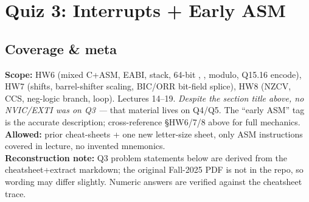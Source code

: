 \section{Quiz 3: Interrupts + Early ASM}

\subsection{Coverage \& meta}
\textbf{Scope:} HW6 (mixed C+ASM, EABI, stack, 64-bit , ,  modulo, Q15.16 encode), HW7 (shifts, barrel-shifter scaling, BIC/ORR bit-field splice), HW8 (NZCV, CCS, neg-logic branch,  loop). Lectures 14--19. \emph{Despite the section title above, no NVIC/EXTI was on Q3 ---} that material lives on Q4/Q5. The ``early ASM'' tag is the accurate description; cross-reference \S HW6/7/8 above for full mechanics.\\
\textbf{Allowed:} prior cheat-sheets + one new letter-size sheet, only ASM instructions covered in lecture, no invented mnemonics.\\
\textbf{Reconstruction note:} Q3 problem statements below are derived from the cheatsheet+extract markdown; the original Fall-2025 PDF is not in the repo, so wording may differ slightly. Numeric answers are verified against the cheatsheet trace.

